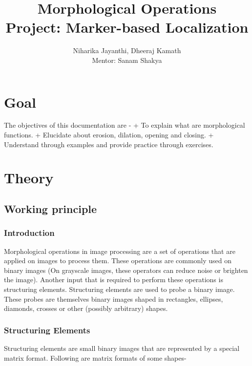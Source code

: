 \documentclass[]{article}
\date{}
\begin{document}
	\title{\huge\textbf{Morphological Operations}\LARGE \\Project: Marker-based Localization}
	\author{Niharika Jayanthi, Dheeraj Kamath \\Mentor: Sanam Shakya}
	\maketitle
\pagebreak
\section{Goal}\label{goal}

The objectives of this documentation are - + To explain what are
morphological functions. + Elucidate about erosion, dilation, opening
and closing. + Understand through examples and provide practice through
exercises.

\section{Theory}\label{theory}

\subsection{Working principle}\label{working-principle}

\subsubsection{Introduction}\label{introduction}

Morphological operations in image processing are a set of operations
that are applied on images to process them. These operations are
commonly used on binary images (On grayscale images, these operators can
reduce noise or brighten the image). Another input that is required to
perform these operations is structuring elements. Structuring elements
are used to probe a binary image. These probes are themselves binary
images shaped in rectangles, ellipses, diamonds, crosses or other
(possibly arbitrary) shapes.

\subsubsection{Structuring Elements}\label{structuring-elements}

Structuring elements are small binary images that are represented by a
special matrix format. Following are matrix formats of some shapes-
\end{document}
